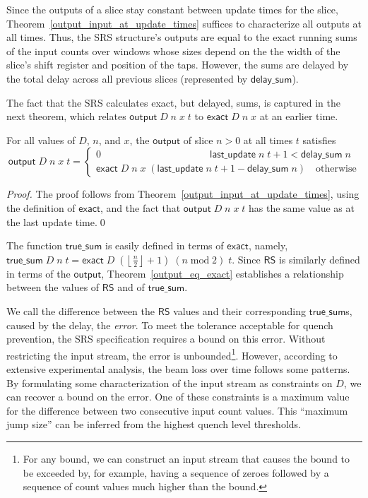 \documentclass{llncs}
\begin{document}
Since the outputs of a slice stay constant between update times for the slice, Theorem~\ref{output_input_at_update_times} suffices to characterize all outputs at all times.
Thus, the SRS structure's outputs are equal to the exact running sums of the input counts over windows whose sizes depend on the the width of the slice's shift register and position of the taps.
However, the sums are delayed by the total delay across all previous slices (represented by $\mathsf{delay\_sum}$).

The fact that the SRS calculates exact, but delayed, sums, is captured in the next theorem, which relates $\mathsf{output}\;D\;n\;x\;t$ to $\mathsf{exact}\;D\;n\;x$ at an earlier time.

\begin{theorem}\label{output_eq_exact}
For all values of $D$, $n$, and $x$, the $\mathsf{output}$ of slice $n>0$ at all times $t$ satisfies
\begin{equation*}
\mathsf{output}\;D\;n\;x\;t=\begin{cases}0\qquad\qquad\qquad\qquad\qquad\quad\mathsf{last\_update}\;n\;t+1<\mathsf{delay\_sum}\;n\\\mathsf{exact}\;D\;n\;x\;(\mathsf{last\_update}\;n\;t+1-\mathsf{delay\_sum}\;n)\quad\text{otherwise}\end{cases}
\end{equation*}
\end{theorem}
\begin{proof}
The proof follows from Theorem~\ref{output_input_at_update_times}, using the definition of $\mathsf{exact}$, and the fact that $\mathsf{output}\;D\;n\;x\;t$ has the same value as at the last update time.\qed
\end{proof}

The function $\mathsf{true\_sum}$ is easily defined in terms of $\mathsf{exact}$, namely, $\mathsf{true\_sum}\;D\;n\;t = \mathsf{exact}\;D\;\left(\left\lfloor\frac{n}{2}\right\rfloor+1\right)\;(n\operatorname{mod}2)\;t$.
Since $\mathsf{RS}$ is similarly defined in terms of the $\mathsf{output}$, Theorem~\ref{output_eq_exact} establishes a relationship between the values of $\mathsf{RS}$ and of $\mathsf{true\_sum}$.

We call the difference between the $\mathsf{RS}$ values and their corresponding $\mathsf{true\_sum}$s, caused by the delay, the \emph{error}.
To meet the tolerance acceptable for quench prevention, the SRS specification requires a bound on this error.
Without restricting the input stream, the error is unbounded\footnote{For any bound, we can construct an input stream that causes the bound to be exceeded by, for example, having a sequence of zeroes followed by a sequence of count values much higher than the bound.}.
However, according to extensive experimental analysis, the beam loss over time follows some patterns.
By formulating some characterization of the input stream as constraints on $D$, we can recover a bound on the error.
One of these constraints is a maximum value for the difference between two consecutive input count values.
This ``maximum jump size'' can be inferred from the highest quench level thresholds.
\end{document}
